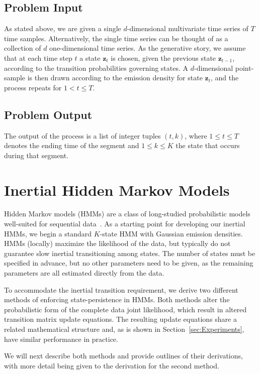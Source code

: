 \documentclass[letterpaper]{article}
\begin{document}
\subsection{Problem Input}

As stated above, we are given a single $d$-dimensional multivariate time series of $T$ time samples. Alternatively, the single time series can be thought of as a collection of $d$ one-dimensional time series. As the generative story, we assume that at each time step $t$ a state $\mathbf{z}_t$ is chosen, given the previous state $\mathbf{z}_{t-1}$, according to the transition probabilities governing states. A $d$-dimensional point-sample is then drawn according to the emission density for state $\mathbf{z}_t$, and the process repeats for $1 < t \leq T$.

\subsection{Problem Output}

The output of the process is a list of integer tuples $(t, k)$, where $1 \leq t \leq T$ denotes the ending time of the segment and $1 \leq k \leq K$ the state that occurs during that segment. 

\section{Inertial Hidden Markov Models}

Hidden Markov models (HMMs) are a class of long-studied probabilistic models
well-suited for sequential data~\cite{rabiner1989tutorial}. As a starting point
for developing our inertial HMMs, we begin a standard $K$-state HMM with
Gaussian emission densities. HMMs (locally) maximize the likelihood of the data,
but typically do not guarantee slow inertial transitioning among states. The
number of states must be specified in advance, but no other parameters need to
be given, as the remaining parameters are all estimated directly from the
data.

To accommodate the inertial transition requirement, we derive two different
methods of enforcing state-persistence in HMMs. Both methods alter the
probabilistic form of the complete data joint likelihood, which result
in altered transition matrix update equations. The resulting update equations
share a related mathematical structure and, as is shown in
Section~\ref{sec:Experiments}, have similar performance in practice.

We will next describe both methods and provide outlines of their derivations,
with more detail being given to the derivation for the second method. 
\end{document}
